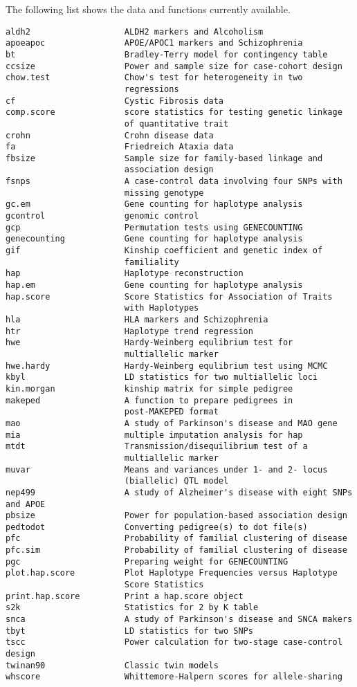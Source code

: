 \documentclass[11pt,a4paper]{article}
\begin{document}
The following list shows the data and functions currently available.

\begin{verbatim}
aldh2                   ALDH2 markers and Alcoholism
apoeapoc                APOE/APOC1 markers and Schizophrenia
bt                      Bradley-Terry model for contingency table
ccsize                  Power and sample size for case-cohort design
chow.test               Chow's test for heterogeneity in two
                        regressions
cf                      Cystic Fibrosis data
comp.score              score statistics for testing genetic linkage
                        of quantitative trait
crohn                   Crohn disease data
fa                      Friedreich Ataxia data
fbsize                  Sample size for family-based linkage and
                        association design
fsnps                   A case-control data involving four SNPs with
                        missing genotype
gc.em                   Gene counting for haplotype analysis
gcontrol                genomic control
gcp                     Permutation tests using GENECOUNTING
genecounting            Gene counting for haplotype analysis
gif                     Kinship coefficient and genetic index of
                        familiality
hap                     Haplotype reconstruction
hap.em                  Gene counting for haplotype analysis
hap.score               Score Statistics for Association of Traits
                        with Haplotypes
hla                     HLA markers and Schizophrenia
htr                     Haplotype trend regression
hwe                     Hardy-Weinberg equlibrium test for
                        multiallelic marker
hwe.hardy               Hardy-Weinberg equlibrium test using MCMC
kbyl                    LD statistics for two multiallelic loci
kin.morgan              kinship matrix for simple pedigree
makeped                 A function to prepare pedigrees in
                        post-MAKEPED format
mao                     A study of Parkinson's disease and MAO gene
mia                     multiple imputation analysis for hap
mtdt                    Transmission/disequilibrium test of a
                        multiallelic marker
muvar                   Means and variances under 1- and 2- locus
                        (biallelic) QTL model
nep499                  A study of Alzheimer's disease with eight SNPs and APOE
pbsize                  Power for population-based association design
pedtodot                Converting pedigree(s) to dot file(s)
pfc                     Probability of familial clustering of disease
pfc.sim                 Probability of familial clustering of disease
pgc                     Preparing weight for GENECOUNTING
plot.hap.score          Plot Haplotype Frequencies versus Haplotype
                        Score Statistics
print.hap.score         Print a hap.score object
s2k                     Statistics for 2 by K table
snca                    A study of Parkinson's disease and SNCA makers
tbyt                    LD statistics for two SNPs
tscc                    Power calculation for two-stage case-control design
twinan90                Classic twin models
whscore                 Whittemore-Halpern scores for allele-sharing
\end{verbatim}
\end{document}
